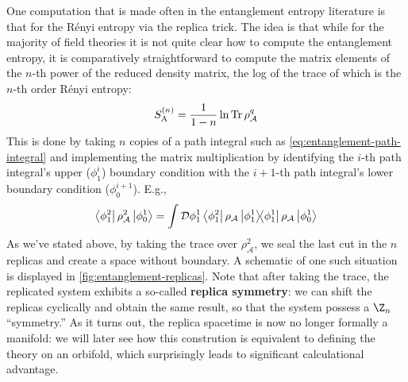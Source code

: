 \documentclass{report}
\begin{document}
 One computation that is made often in the entanglement 
entropy literature is that for the R\'enyi entropy via the replica trick. The 
idea is that while for the majority of field theories it is not quite clear 
how to compute the entanglement entropy, it is comparatively straightforward to 
compute the matrix elements of the $ n $-th power of the reduced density 
matrix, the log of the trace of which is the $ n $-th order R\'enyi entropy: 
\begin{equation*}
	S_{\text{A}}^{(n)}
		= \frac{1}{1-n} \ln \Tr \rho_\mathcal{A}^q
\end{equation*}
This is done by taking $ n $ copies of a path integral such as
\cref{eq:entanglement-path-integral} and implementing the matrix multiplication
by identifying the $ i $-th path integral's upper ($ \phi_1^i $) boundary condition with the 
$ i+1 $-th path integral's lower boundary condition ($ \phi_0^{i+1} $). E.g., 
\begin{equation*}
	\bra{\phi_1^2}\rho^2_\mathcal{A} \ket{\phi_0^1}= 
	\int \mathcal{D}\phi_1^1 
	\bra{\phi_1^2}\rho_\mathcal{A} \ketbra{\phi_1^1} \rho_\mathcal{A} \ket{\phi_0^1}
\end{equation*}
As we've stated above, by taking the trace over $ \rho_\mathcal{A}^2 $, we seal
the last cut in the $ n $ replicas and create a space without boundary.
A schematic of one such situation is displayed in \cref{fig:entanglement-replicas}.
Note that after taking the trace, the replicated system exhibits a so-called 
\textbf{replica symmetry}: we can shift the replicas cyclically and obtain the 
same result, so that the system possess a $ \Z_n $ ``symmetry.'' As it turns
out, the replica spacetime is now no longer formally a manifold:
we will later see how this constrution is equivalent to defining the theory on 
an orbifold, which surprisingly leads to significant calculational advantage.
\end{document}
